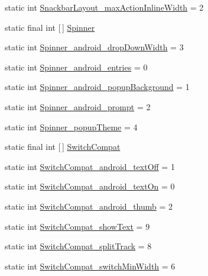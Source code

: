 \begin{DoxyCompactItemize}
static int \hyperlink{classandroid_1_1support_1_1design_1_1R_1_1styleable_a66890a4c37503ae7fd6e09cbefc592bf}{Snackbar\+Layout\+\_\+max\+Action\+Inline\+Width} = 2
\item 
static final int \mbox{[}$\,$\mbox{]} \hyperlink{classandroid_1_1support_1_1design_1_1R_1_1styleable_ac36e55e5a1c717e866dcadd92552fa64}{Spinner}
\item 
static int \hyperlink{classandroid_1_1support_1_1design_1_1R_1_1styleable_ae8ecbc06818c2f20c1ce916dea5258d0}{Spinner\+\_\+android\+\_\+drop\+Down\+Width} = 3
\item 
static int \hyperlink{classandroid_1_1support_1_1design_1_1R_1_1styleable_a2d05682e0b3d919b968bca48f733aab2}{Spinner\+\_\+android\+\_\+entries} = 0
\item 
static int \hyperlink{classandroid_1_1support_1_1design_1_1R_1_1styleable_ae1f9a39bc965c26a19d360729ee54483}{Spinner\+\_\+android\+\_\+popup\+Background} = 1
\item 
static int \hyperlink{classandroid_1_1support_1_1design_1_1R_1_1styleable_a601b330e85f621a2fd8f83ea6aa87d52}{Spinner\+\_\+android\+\_\+prompt} = 2
\item 
static int \hyperlink{classandroid_1_1support_1_1design_1_1R_1_1styleable_a59a6d161b7f6cda7fafb201a44bebca6}{Spinner\+\_\+popup\+Theme} = 4
\item 
static final int \mbox{[}$\,$\mbox{]} \hyperlink{classandroid_1_1support_1_1design_1_1R_1_1styleable_a7389a923bf3e321b6b5d10b0589547a1}{Switch\+Compat}
\item 
static int \hyperlink{classandroid_1_1support_1_1design_1_1R_1_1styleable_afc78502d3a5178e334e2aa0dda302911}{Switch\+Compat\+\_\+android\+\_\+text\+Off} = 1
\item 
static int \hyperlink{classandroid_1_1support_1_1design_1_1R_1_1styleable_a0136948ad38febd192da29e124c66592}{Switch\+Compat\+\_\+android\+\_\+text\+On} = 0
\item 
static int \hyperlink{classandroid_1_1support_1_1design_1_1R_1_1styleable_a972b91a83c0a2fdfefe8475614790641}{Switch\+Compat\+\_\+android\+\_\+thumb} = 2
\item 
static int \hyperlink{classandroid_1_1support_1_1design_1_1R_1_1styleable_ace1bee7dddfc32341fc2cd3d3275df8e}{Switch\+Compat\+\_\+show\+Text} = 9
\item 
static int \hyperlink{classandroid_1_1support_1_1design_1_1R_1_1styleable_a68f00076b8d71029b001f03098c38865}{Switch\+Compat\+\_\+split\+Track} = 8
\item 
static int \hyperlink{classandroid_1_1support_1_1design_1_1R_1_1styleable_a585749966845c547e820061f2d0f6148}{Switch\+Compat\+\_\+switch\+Min\+Width} = 6

\end{DoxyCompactItemize}
